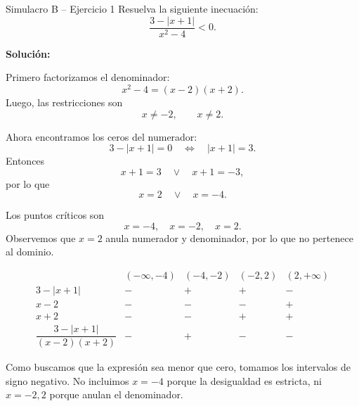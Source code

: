 \documentclass[letterpaper, 12pt]{article}
\begin{document}
\begin{solucionbox}{Simulacro B -- Ejercicio 1}
Resuelva la siguiente inecuaci\'on:
\[
    \frac{3-|x+1|}{x^2-4}<0.
\]

\textbf{Soluci\'on:}

Primero factorizamos el denominador:
\[
    x^2-4=(x-2)(x+2).
\]
Luego, las restricciones son
\[
    x\neq -2,\qquad x\neq 2.
\]

Ahora encontramos los ceros del numerador:
\[
    3-|x+1|=0
    \quad\Longleftrightarrow\quad
    |x+1|=3.
\]
Entonces
\[
    x+1=3 \quad \vee \quad x+1=-3,
\]
por lo que
\[
    x=2 \quad \vee \quad x=-4.
\]

Los puntos cr\'iticos son
\[
    x=-4,\quad x=-2,\quad x=2.
\]
Observemos que $x=2$ anula numerador y denominador, por lo que no pertenece al dominio.

\[
\begin{array}{c|cccc}
    & (-\infty,-4) & (-4,-2) & (-2,2) & (2,+\infty) \\ \hline
    3-|x+1| & - & + & + & - \\
    x-2 & - & - & - & + \\
    x+2 & - & - & + & + \\ \hline
    \dfrac{3-|x+1|}{(x-2)(x+2)} & - & + & - & -
\end{array}
\]

Como buscamos que la expresi\'on sea menor que cero, tomamos los intervalos de signo negativo. No incluimos $x=-4$ porque la desigualdad es estricta, ni $x=-2,2$ porque anulan el denominador.

\end{solucionbox}
\end{document}
